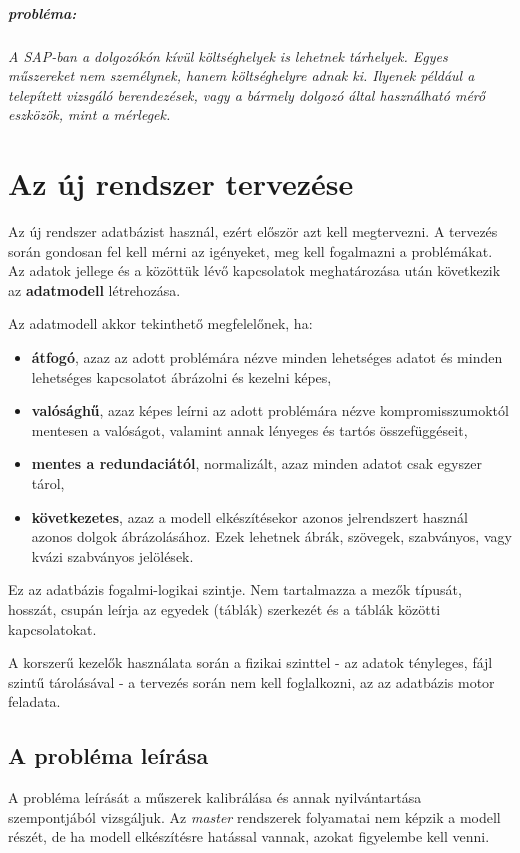 \documentclass[a4paper,12pt]{report}
\begin{document}
\paragraph*{probléma:}
\textit{
A SAP-ban a dolgozókón kívül költséghelyek is lehetnek tárhelyek. Egyes 
műszereket nem személynek, hanem költséghelyre adnak ki. Ilyenek például a 
telepített vizsgáló berendezések, vagy a bármely dolgozó által használható mérő 
eszközök, mint a mérlegek.
}

\chapter{Az új rendszer tervezése}

Az új rendszer adatbázist használ, ezért először azt kell megtervezni. 
A tervezés során gondosan fel kell mérni az igényeket, meg kell fogalmazni a 
problémákat. Az adatok jellege és a közöttük lévő kapcsolatok meghatározása 
után következik az \textbf{adatmodell} létrehozása. 

Az adatmodell akkor tekinthető megfelelőnek, ha:
\begin{itemize}
 \item \textbf{átfogó}, azaz az adott problémára nézve minden lehetséges adatot
 és minden lehetséges kapcsolatot ábrázolni és kezelni képes,
 \item \textbf{valósághű}, azaz képes leírni az adott problémára nézve
 kompromisszumoktól mentesen a valóságot, valamint annak lényeges és tartós 
 összefüggéseit,
 \item \textbf{mentes a redundaciától}, normalizált, azaz minden adatot csak 
egyszer tárol,
 \item \textbf{következetes}, azaz a modell elkészítésekor azonos jelrendszert 
használ azonos dolgok ábrázolásához. Ezek lehetnek ábrák, szövegek, szabványos, 
vagy kvázi szabványos jelölések.
\end{itemize}
Ez az adatbázis fogalmi-logikai szintje. Nem tartalmazza a mezők típusát, 
hosszát, csupán leírja az egyedek (táblák) szerkezét és a táblák közötti 
kapcsolatokat.

A korszerű kezelők használata során a fizikai szinttel - az adatok tényleges, 
fájl szintű tárolásával - a tervezés során nem kell foglalkozni, az az 
adatbázis motor feladata. 



\section{A probléma leírása}
A probléma leírását a műszerek kalibrálása és annak nyilvántartása szempontjából
vizsgáljuk. Az \textit{master} rendszerek folyamatai nem képzik a modell 
részét, de ha modell elkészítésre hatással vannak, azokat figyelembe kell venni.
\end{document}
